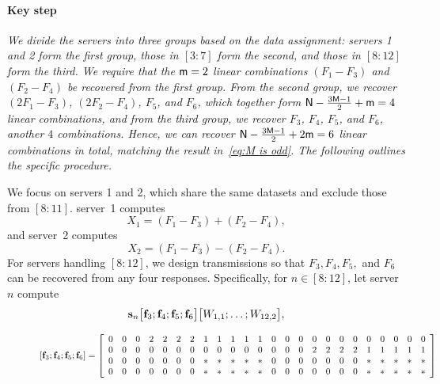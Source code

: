 \documentclass[conference,letterpaper]{IEEEtran}
\begin{document}
\begin{example}
\paragraph*{Key step}
\textit{We divide the servers into three groups based on the data assignment: servers 1 and 2 form the first group, those in $[3\!:\!7]$ form the second, and those in $[8\!:\!12]$ form the third. We require that the ${\sf m}=2$ linear combinations \((F_1 - F_3)\) and \((F_2 - F_4)\) be recovered from the first group. From the second group, we recover \((2F_1 - F_3)\), \((2F_2 - F_4)\), \(F_5\), and \(F_6\), which together form \({\sf N} - \frac{3{\sf M} - 1}{2} + {\sf m} = 4\) linear combinations, and from the third group, we recover \(F_3\), \(F_4\), \(F_5\), and \(F_6\), another \(4\) combinations. Hence, we can recover 
${\sf N} - \frac{3{\sf M} - 1}{2} + 2{\sf m} = 6$ linear combinations in total, matching the result in~\eqref{eq:M is odd}. The following outlines the specific procedure.}





We focus on servers 1 and 2, which share the same datasets and exclude those from $[8{:}11]$. 
server~1 computes 
\[
X_1 = (F_1 - F_3) + (F_2 - F_4),
\]
and server~2 computes
\[
X_2 = (F_1 - F_3) - (F_2 - F_4).
\]
For servers handling $[8{:}12]$, we design transmissions so that $F_3, F_4, F_5,$ and $F_6$ 
can be recovered from any four responses. Specifically, for $n \in [8{:}12]$, let 
server~$n$ compute
\[
{\bf s}_n \bigl[ {\bf f}_3 ; {\bf f}_4 ; {\bf f}_5 ; {\bf f}_6 \bigr] 
\bigl[ W_{1,1}; \ldots; W_{12,2} \bigr],
\]


\iffalse
\begin{figure}
\begin{equation} \label{eq:scheme 3 transmission of second class}
\begin{aligned}
\left[ {{\bf f}}_3 ;  {{\bf f}}_4 ;  {{\bf f}}_5 ;  {{\bf f}}_6 \right] = 
 \left[
\begin{array}{cccccccccccccccccccccccc}
 0 & 0 & 0 &  2 & 2 & 2 & 2 &  1 & 1 & 1 & 1 & 1 & 0 & 0 & 0 & 0 & 0 & 0 & 0 & 0 & 0 & 0 & 0 & 0 \\
 0 & 0 & 0 & 0 & 0 & 0 & 0 & 0 & 0 & 0 & 0 & 0 & 0 & 0 & 0 & 2 & 2 & 2 & 2 & 1 & 1 & 1 & 1 & 1 \\
 0 & 0 & 0 & 0 & 0 & 0 & 0 & * & * & * & * & * & 0 & 0 & 0 & 0 & 0 & 0 & 0 & * & * & * & * & * \\
 0 & 0 & 0 & 0 & 0 & 0 & 0 & * & * & * & * & * & 0 & 0 & 0 & 0 & 0 & 0 & 0 & * & * & * & * & *
\end{array}
 \right]
\end{aligned}
\end{equation}
\end{figure}


\end{example}
\end{document}
